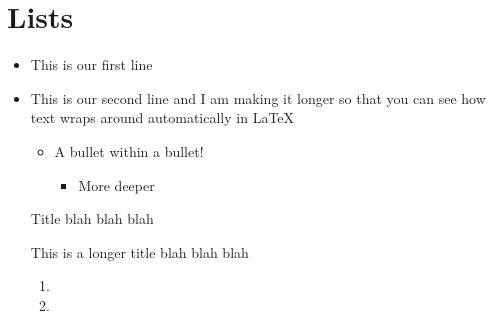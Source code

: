 \documentclass{article}
\begin{document}
\section{Lists}
\begin{itemize}
	\item This is our first line
	\item This is our second line and I am making it longer so that you can see how text wraps around automatically in \LaTeX
	\begin{itemize}
		\item A bullet within a bullet!
		\begin{itemize}
			\item More deeper
		\end{itemize}
	\end{itemize}
	\item [Title] blah blah blah
	\item [This is a longer title] blah blah blah
	\begin{enumerate}
		\item \lipsum[1]
		\item \lipsum[2]
	\end{enumerate}
\end{itemize}
\end{document}
